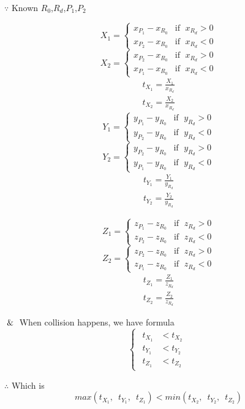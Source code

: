 $\because$ Known $R_0$,\enspace$R_d$,\enspace$P_1$,\enspace$P_2$
\begin{multicols}{2}
\noindent
\[
X_1 =
\begin{cases}
x_{P_1} - x_{R_0} & \text{if }\;x_{R_d} > 0 \\
x_{P_2} - x_{R_0} & \text{if }\;x_{R_d} < 0
\end{cases}
\]
\[
X_2 =
\begin{cases}
x_{P_2} - x_{R_0} & \text{if }\;x_{R_d} > 0 \\
x_{P_1} - x_{R_0} & \text{if }\;x_{R_d} < 0
\end{cases}
\]
\[
\begin{array}{lr}
t_{X_1} = \frac{X_1}{x_{R_d}} \\
t_{X_2} = \frac{X_2}{x_{R_d}}
\end{array}
\]
\columnbreak
\[
Y_1 =
\begin{cases}
y_{P_1} - y_{R_0} & \text{if }\;y_{R_d} > 0 \\
y_{P_2} - y_{R_0} & \text{if }\;y_{R_d} < 0
\end{cases}
\]
\[
Y_2 =
\begin{cases}
y_{P_2} - y_{R_0} & \text{if }\;y_{R_d} > 0 \\
y_{P_1} - y_{R_0} & \text{if }\;y_{R_d} < 0
\end{cases}
\]
\[
\begin{array}{lr}
t_{Y_1} = \frac{Y_1}{y_{R_d}} \\
t_{Y_2} = \frac{Y_2}{y_{R_d}}
\end{array}
\]
\end{multicols}
\begin{multicols}{2}
\noindent
\[
Z_1 =
\begin{cases}
z_{P_1} - z_{R_0} & \text{if }\;z_{R_d} > 0 \\
z_{P_2} - z_{R_0} & \text{if }\;z_{R_d} < 0
\end{cases}
\]
\[
Z_2 =
\begin{cases}
z_{P_2} - z_{R_0} & \text{if }\;z_{R_d} > 0 \\
z_{P_1} - z_{R_0} & \text{if }\;z_{R_d} < 0
\end{cases}
\]
\[
\begin{array}{lr}
t_{Z_1} = \frac{Z_1}{z_{R_d}} \\
t_{Z_2} = \frac{Z_2}{z_{R_d}}
\end{array}
\]
\columnbreak
\[
\]
\end{multicols}

$\And$ When collision happens,  we have formula
\[
\left\{
\begin{array}{lr}
\begin{aligned}
t_{X_1} &< t_{X_2} \\
t_{Y_1} &< t_{Y_2} \\
t_{Z_1} &< t_{Z_2}
\end{aligned}
\end{array}
\right.
\]

$\therefore$ Which is
\begin{equation}
\label{equ:ray-box-3d-intersection}
max(t_{X_1},\enspace t_{Y_1},\enspace t_{Z_1}) < min(t_{X_2},\enspace t_{Y_2},\enspace t_{Z_2})
\end{equation}

